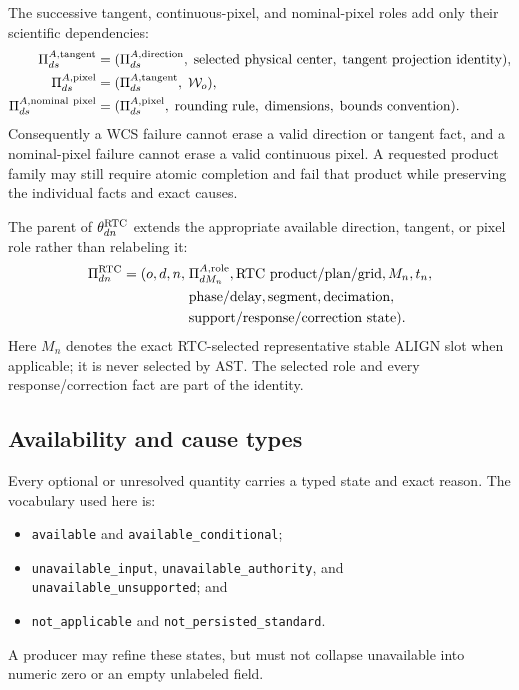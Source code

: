 The successive tangent, continuous-pixel, and nominal-pixel roles add only
their scientific dependencies:
\begin{align}
 \Pi^{A,{\rm tangent}}_{ds}
   &= (\Pi^{A,{\rm direction}}_{ds},\;
       \text{selected physical center},\;
       \text{tangent projection identity}),
       \label{eq:tangent-parent}\\
 \Pi^{A,{\rm pixel}}_{ds}
   &= (\Pi^{A,{\rm tangent}}_{ds},\;\mathcal W_o),
       \label{eq:pixel-parent}\\
 \Pi^{A,{\rm nominal\ pixel}}_{ds}
   &= (\Pi^{A,{\rm pixel}}_{ds},\;\text{rounding rule},\;
       \text{dimensions},\;\text{bounds convention}).
       \label{eq:nominal-pixel-parent}
\end{align}
Consequently a WCS failure cannot erase a valid direction or tangent fact,
and a nominal-pixel failure cannot erase a valid continuous pixel.  A
requested product family may still require atomic completion and fail that
product while preserving the individual facts and exact causes.

The parent of $\theta^{\rm RTC}_{dn}$ extends the appropriate available
direction, tangent, or pixel role rather than relabeling it:
\begin{equation}
 \begin{aligned}
 \Pi^{\rm RTC}_{dn} = (o,d,n,\;&\Pi^{A,{\rm role}}_{dM_n},
   \text{RTC product/plan/grid},M_n,t_n,\\
   &\text{phase/delay},\text{segment},\text{decimation},\\
   &\text{support/response/correction state}).
 \end{aligned}
 \label{eq:rtc-parent}
\end{equation}
Here $M_n$ denotes the exact RTC-selected representative stable ALIGN slot
when applicable; it is never selected by AST.  The selected role and every
response/correction fact are part of the identity.

\subsection{Availability and cause types}

Every optional or unresolved quantity carries a typed state and exact reason.
The vocabulary used here is:
\begin{itemize}
  \item \texttt{available} and \texttt{available\_conditional};
  \item \texttt{unavailable\_input}, \texttt{unavailable\_authority}, and
        \texttt{unavailable\_unsupported}; and
  \item \texttt{not\_applicable} and \texttt{not\_persisted\_standard}.
\end{itemize}
A producer may refine these states, but must not collapse unavailable into
numeric zero or an empty unlabeled field.


